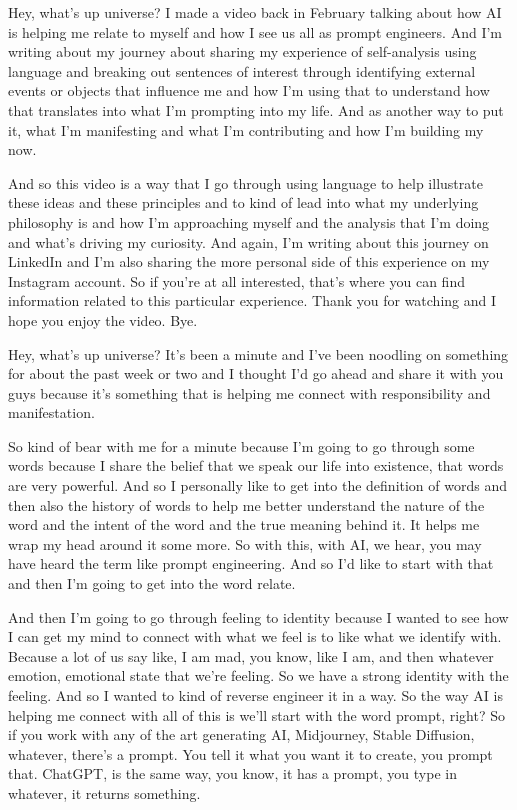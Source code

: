 \documentclass{article}
\begin{document}

\date{April 21, 2023}

\medskip

Hey, what's up universe? I made a video back in February talking about how AI is helping me
relate to myself and how I see us all as prompt engineers. And I'm writing about my journey
about sharing my experience of self-analysis using language and breaking out sentences of
interest through identifying external events or objects that influence me and how I'm using that
to understand how that translates into what I'm prompting into my life. And as another way to
put it, what I'm manifesting and what I'm contributing and how I'm building my now.

\medskip

And so this video is a way that I go through using language to help illustrate these ideas
and these principles and to kind of lead into what my underlying philosophy is
and how I'm approaching myself and the analysis that I'm doing and what's driving my curiosity.
And again, I'm writing about this journey on LinkedIn and I'm also sharing the more personal
side of this experience on my Instagram account. So if you're at all interested, that's where you can find information related to this particular experience. Thank you for watching and I hope you enjoy the video. Bye. 

\medskip

Hey, what's up universe? It's been a minute and I've been noodling on something for about the past week or two and I thought I'd go ahead and share it with you guys because it's something that is helping me connect with responsibility and manifestation.

\medskip

So kind of bear with me for a minute because I'm going to go through some words because I share the belief that we speak our life into existence, that words are very powerful. And so I personally
like to get into the definition of words and then also the history of words to help me better
understand the nature of the word and the intent of the word and the true meaning behind it. It
helps me wrap my head around it some more. So with this, with AI, we hear, you may have heard
the term like prompt engineering. And so I'd like to start with that and then I'm going to get into
the word relate. 

\medskip

And then I'm going to go through feeling to identity because I wanted to see how
I can get my mind to connect with what we feel is to like what we identify with. Because a lot
of us say like, I am mad, you know, like I am, and then whatever emotion, emotional state that
we're feeling. So we have a strong identity with the feeling. And so I wanted to kind of reverse
engineer it in a way. So the way AI is helping me connect with all of this is we'll start with
the word prompt, right? So if you work with any of the art generating AI, Midjourney,
Stable Diffusion, whatever, there's a prompt. You tell it what you want it to create, you prompt
that. ChatGPT, is the same way, you know, it has a prompt, you type in whatever, it returns something.
\end{document}
